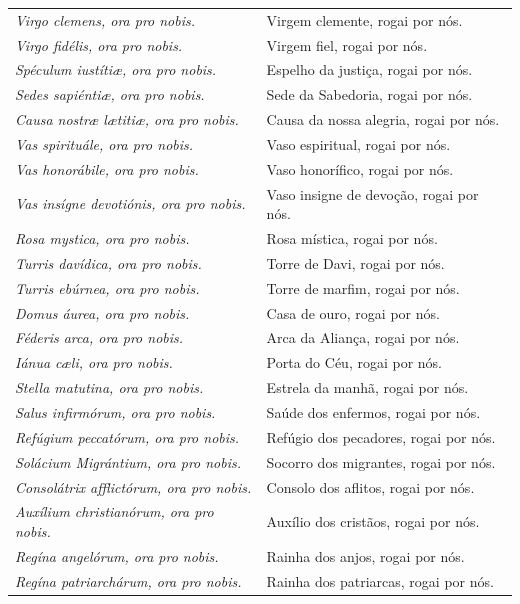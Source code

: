 \documentclass[a4paper,14pt]{extarticle} \usepackage[utf8]{inputenc}
\begin{document}
\begin{center}
\begin{longtable}{p{}|p{}}
\textit{Virgo clemens, ora pro nobis.} & Virgem clemente, rogai por nós. \\
\textit{Virgo fidélis, ora pro nobis.} & Virgem fiel, rogai por nós. \\
\textit{Spéculum iustíti\ae{}, ora pro nobis.} & Espelho da justiça, rogai por nós. \\
\textit{Sedes sapiénti\ae{}, ora pro nobis.} & Sede da Sabedoria, rogai por nós. \\
\textit{Causa nostr\ae{} l\ae{}titi\ae{}, ora pro nobis.} & Causa da nossa alegria, rogai por nós. \\
\textit{Vas spirituále, ora pro nobis.} & Vaso espiritual, rogai por nós. \\
\textit{Vas honorábile, ora pro nobis.} & Vaso honorífico, rogai por nós. \\
\textit{Vas insígne devotiónis, ora pro nobis.} & Vaso insigne de devoção, rogai por nós. \\
\textit{Rosa mystica, ora pro nobis.} & Rosa mística, rogai por nós. \\
\textit{Turris davídica, ora pro nobis.} & Torre de Davi, rogai por nós. \\
\textit{Turris ebúrnea, ora pro nobis.} & Torre de marfim, rogai por nós. \\
\textit{Domus áurea, ora pro nobis.} & Casa de ouro, rogai por nós. \\
\textit{Féderis arca, ora pro nobis.} & Arca da Aliança, rogai por nós. \\
\textit{Iánua c\ae{}li, ora pro nobis.} & Porta do Céu, rogai por nós. \\
\textit{Stella matutina, ora pro nobis.} & Estrela da manhã, rogai por nós. \\
\textit{Salus infirmórum, ora pro nobis.} & Saúde dos enfermos, rogai por nós. \\
\textit{Refúgium peccatórum, ora pro nobis.} & Refúgio dos pecadores, rogai por nós. \\
\textit{Solácium Migrántium, ora pro nobis.} & Socorro dos migrantes, rogai por nós. \\
\textit{Consolátrix afflictórum, ora pro nobis.} & Consolo dos aflitos, rogai por nós. \\
\textit{Auxílium christianórum, ora pro nobis.} & Auxílio dos cristãos, rogai por nós. \\
\textit{Regína angelórum, ora pro nobis.} & Rainha dos anjos, rogai por nós. \\
\textit{Regína patriarchárum, ora pro nobis.} & Rainha dos patriarcas, rogai por nós. \\

\end{longtable}
\end{center}
\end{document}
